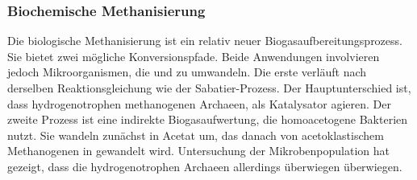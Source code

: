 \subsubsection{Biochemische Methanisierung}\label{chap:biochem} 

Die biologische Methanisierung ist ein relativ neuer Biogasaufbereitungsprozess. Sie bietet zwei mögliche Konversionspfade. Beide Anwendungen involvieren jedoch Mikroorganismen, die  und  zu  umwandeln. Die erste verläuft nach derselben Reaktionsgleichung wie der Sabatier-Prozess. Der Hauptunterschied ist, dass hydrogenotrophen methanogenen Archaeen, als Katalysator agieren. Der zweite Prozess ist eine indirekte Biogasaufwertung, die homoacetogene Bakterien nutzt. Sie wandeln  zunächst in Acetat um, das danach von acetoklastischem Methanogenen in  gewandelt wird. Untersuchung der Mikrobenpopulation hat gezeigt, dass die hydrogenotrophen Archaeen allerdings überwiegen überwiegen. \parencite{KGKK2019} \parencite{AONC2019} \parencite{VRM2019}


